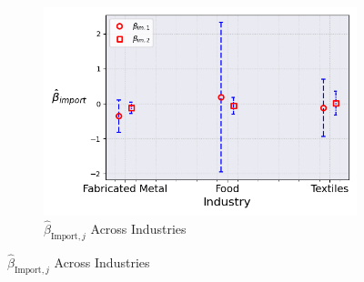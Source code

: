 \documentclass{article}
\begin{document}
\begin{figure}[ht!]
\begin{subfigure}[t]{0.32\textwidth}
        \includegraphics[width=\textwidth]{figure/stationary_normal_kmshare_ciiu_beta_im_across_industries_m2.png}
        \caption{$\hat{\beta}_{\text{Import},j}$ Across Industries}
    \end{subfigure}
\end{figure}
\end{document}
